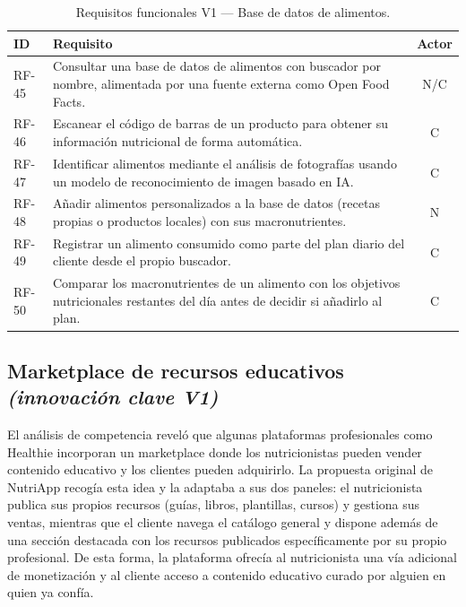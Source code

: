 \begin{table}[htbp]
\centering
\small
\begin{tabular}{|l|p{10.5cm}|c|}
\hline
\textbf{ID} & \textbf{Requisito} & \textbf{Actor} \\
\hline
RF-45 & Consultar una base de datos de alimentos con buscador por nombre, alimentada por una fuente externa como Open Food Facts. & N/C \\
\hline
RF-46 & Escanear el código de barras de un producto para obtener su información nutricional de forma automática. & C \\
\hline
RF-47 & Identificar alimentos mediante el análisis de fotografías usando un modelo de reconocimiento de imagen basado en IA. & C \\
\hline
RF-48 & Añadir alimentos personalizados a la base de datos (recetas propias o productos locales) con sus macronutrientes. & N \\
\hline
RF-49 & Registrar un alimento consumido como parte del plan diario del cliente desde el propio buscador. & C \\
\hline
RF-50 & Comparar los macronutrientes de un alimento con los objetivos nutricionales restantes del día antes de decidir si añadirlo al plan. & C \\
\hline
\end{tabular}
\caption{Requisitos funcionales V1 --- Base de datos de alimentos.}
\label{tab:rf-alimentos-v1}
\end{table}

\subsection{Marketplace de recursos educativos \textnormal{\textit{(innovación clave V1)}}}

El análisis de competencia reveló que algunas plataformas profesionales como Healthie incorporan un marketplace donde los nutricionistas pueden vender contenido educativo y los clientes pueden adquirirlo. La propuesta original de NutriApp recogía esta idea y la adaptaba a sus dos paneles: el nutricionista publica sus propios recursos (guías, libros, plantillas, cursos) y gestiona sus ventas, mientras que el cliente navega el catálogo general y dispone además de una sección destacada con los recursos publicados específicamente por su propio profesional. De esta forma, la plataforma ofrecía al nutricionista una vía adicional de monetización y al cliente acceso a contenido educativo curado por alguien en quien ya confía.

